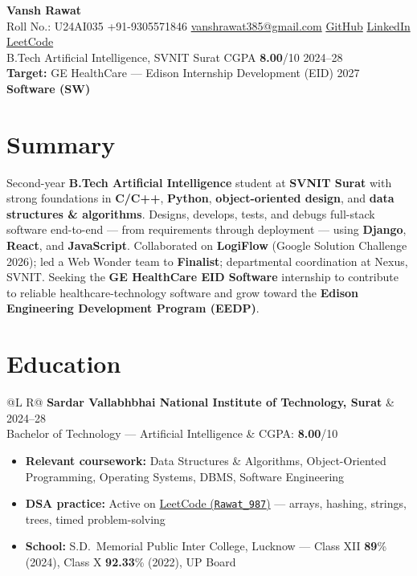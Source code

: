 \documentclass[a4paper,10pt]{article}
\makeatletter
\newcommand{\entry}[4]{%
  \vspace{0.5mm}
  \noindent\begin{tabularx}{\textwidth}{@{}L R@{}}
    \textbf{#1} & {\small #2} \\
    {\small #3} & {\small #4} \\
  \end{tabularx}\par
}
\makeatother
\begin{document}
\selectfont

\begin{center}
  {\LARGE \textbf{Vansh Rawat}} \\[1.1mm]
  \small
  Roll No.: U24AI035 \textbar{}
  +91-9305571846 \textbar{}
  \href{mailto:vanshrawat385@gmail.com}{vanshrawat385@gmail.com} \textbar{}
  \href{https://github.com/Vansh-ai406/}{GitHub} \textbar{}
  \href{https://www.linkedin.com/in/vansh-rawat-020612337/}{LinkedIn} \textbar{}
  \href{https://leetcode.com/u/Rawat_987/}{LeetCode} \\[0.35mm]
  B.Tech Artificial Intelligence, SVNIT Surat \textbar{} CGPA \textbf{8.00}/10 \textbar{} 2024--28 \\[0.25mm]
  \textbf{Target:} GE HealthCare --- Edison Internship Development (EID) 2027 \textbar{} \textbf{Software (SW)}
\end{center}

\section{Summary}
\noindent\small
Second-year \textbf{B.Tech Artificial Intelligence} student at \textbf{SVNIT Surat} with strong foundations in \textbf{C/C++}, \textbf{Python}, \textbf{object-oriented design}, and \textbf{data structures \& algorithms}.
Designs, develops, tests, and debugs full-stack software end-to-end --- from requirements through deployment --- using \textbf{Django}, \textbf{React}, and \textbf{JavaScript}.
Collaborated on \textbf{LogiFlow} (Google Solution Challenge 2026); led a Web Wonder team to \textbf{Finalist}; departmental coordination at Nexus, SVNIT.
Seeking the \textbf{GE HealthCare EID Software} internship to contribute to reliable healthcare-technology software and grow toward the \textbf{Edison Engineering Development Program (EEDP)}.

\section{Education}
\entry{Sardar Vallabhbhai National Institute of Technology, Surat}{2024--28}
{Bachelor of Technology --- Artificial Intelligence}{CGPA: \textbf{8.00}/10}
\begin{itemize}
  \item \textbf{Relevant coursework:} Data Structures \& Algorithms, Object-Oriented Programming, Operating Systems, DBMS, Software Engineering
  \item \textbf{DSA practice:} Active on \href{https://leetcode.com/u/Rawat_987/}{LeetCode (\texttt{Rawat\_987})} --- arrays, hashing, strings, trees, timed problem-solving
  \item \textbf{School:} S.D.\ Memorial Public Inter College, Lucknow --- Class XII \textbf{89}\% (2024), Class X \textbf{92.33}\% (2022), UP Board
\end{itemize}
\end{document}
